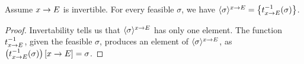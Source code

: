 %
%
%
%

\begin{remark} \label{thm:pp:assign:one-inverse} Assume $ x \rightarrow E $ is invertible. For every
feasible $ \sigma $, we have $ \langle \sigma \rangle^{x \rightarrow E}
= \left\{ t_{x \rightarrow E}^{-1}(\sigma) \right\} $.
\end{remark}

\begin{proof} Invertability tells us that $ \langle \sigma \rangle^{x \rightarrow E} $
has only one element. The function $ t_{x \rightarrow E}^{-1} $, given
the feasible $ \sigma $, produces an element of
$ \langle \sigma \rangle^{x \rightarrow E} $, as
$ \left( t_{x \rightarrow E}^{-1}(\sigma) \right) \left[ x \rightarrow E \right] = \sigma $.
\end{proof}

